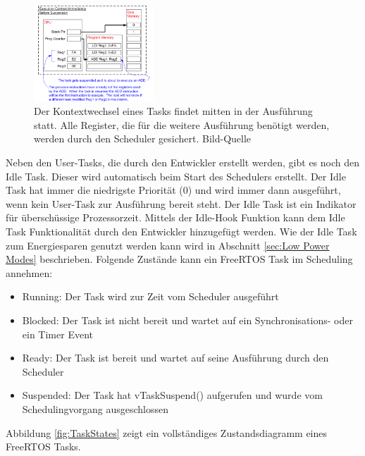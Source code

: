 \begin{figure}[ht!]
	\centering
		\includegraphics[width=0.4\textwidth]{Pictures/FreeRTOSOrg/ExeContext.png}
	\caption{Der Kontextwechsel eines Tasks findet mitten in der Aus\-füh\-rung statt. Alle Register, die für die weitere Ausführung benötigt werden, werden durch den Scheduler gesichert. Bild-Quelle~\protect{} }
	\label{fig:ContextSwitch}
\end{figure}
\newline
Neben den User-Tasks, die durch den Entwickler erstellt werden, gibt es noch den Idle Task. Dieser wird automatisch beim Start des Schedulers erstellt. Der Idle Task hat immer die niedrigste Priorität (0) und wird immer dann ausgeführt, wenn kein User-Task zur Aus\-füh\-rung bereit steht. Der Idle Task ist ein Indikator für über\-schüss\-ige Prozessorzeit. Mittels der Idle-Hook Funktion kann dem Idle Task Funktionalität durch den Entwickler hinzugefügt werden. Wie der Idle Task zum Energiesparen genutzt werden kann wird in Abschnitt \ref{sec:Low Power Modes} beschrieben.
Folgende Zu\-stän\-de kann ein FreeRTOS Task im Scheduling annehmen: 
\begin{itemize}
	\item Running: Der Task wird zur Zeit vom Scheduler ausgeführt
	\item Blocked: Der Task ist nicht bereit und wartet auf ein Synchronisations- oder ein Timer Event
	\item Ready: Der Task ist bereit und wartet auf seine Aus\-füh\-rung durch den Scheduler
	\item Suspended: Der Task hat vTaskSuspend() aufgerufen und wurde vom Schedulingvorgang ausgeschlossen
\end{itemize}
 Abbildung \ref{fig:TaskStates} zeigt ein vollständiges Zustandsdiagramm eines FreeRTOS Tasks.
